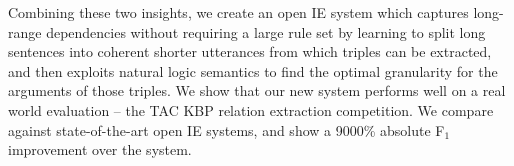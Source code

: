 Combining these two insights, we create an open IE system which
  captures long-range dependencies without requiring a large rule set
  by learning to split long sentences into coherent shorter utterances
  from which triples can be extracted,
  and then exploits natural logic semantics to find the optimal granularity
  for the arguments of those triples.
We show that our new system performs well on a real world evaluation --
  the TAC KBP relation extraction competition.
We compare against state-of-the-art open IE systems, and show a
  9000\% absolute F$_1$ improvement over the system.


%



